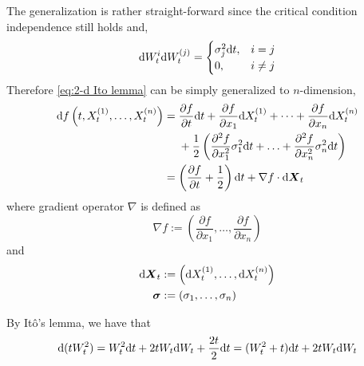 \documentclass{homework}
\begin{document}
\begin{subproblem}[(\alph*)]
        \item
        The generalization is rather straight-forward since
        the critical condition independence still holds and,
        \[\mathrm d W_t^{i}\mathrm d W_t^{(j)}=
        \begin{cases}
            \sigma_j^2\mathrm d t,&i=j\\
            0,&i\neq j
        \end{cases}\]
        Therefore \cref{eq:2-d Ito lemma} can be simply generalized
        to $n$-dimension,
        \begin{equation*}
            \begin{aligned}
            \mathrm d f\left(t,X_t^{(1)},\ldots,X_t^{(n)}\right)&=
            \begin{aligned}[t]
            &\frac{\partial f}{\partial t}\mathrm d t
            +\frac{\partial f}{\partial x_1}\mathrm d X_t^{(1)}
            +\cdots
            +\frac{\partial f}{\partial x_n}\mathrm d X_t^{(n)}\\
            &+\frac{1}{2}\left(
                \frac{\partial^2 f}{\partial x_1^2}\sigma_1^2\mathrm d t
                +\ldots
                +\frac{\partial^2 f}{\partial x_n^2}\sigma_n^2\mathrm d t
            \right)
            \end{aligned}\\
            &=\left(\frac{\partial f}{\partial t}
            +\frac{1}{2}\right)\mathrm d t
            +\nabla f\cdot\mathrm d\boldsymbol X_t
            \end{aligned}
        \end{equation*}
        where gradient operator $\nabla$ is defined as
        \[\nabla f:=\left(\frac{\partial f}{\partial x_1},\ldots,\frac{\partial f}{\partial x_n}\right)\]
        and
        \[\begin{aligned}
            \mathrm d\boldsymbol X_t&:=
            \left(\mathrm d X_t^{(1)},\ldots,\mathrm d X_t^{(n)}\right)\\
            \boldsymbol\sigma&:=
            \left(\sigma_1,\ldots,\sigma_n\right)
        \end{aligned}\]
        
        \item
    \end{subproblem}

    \problem
    By It\^o's lemma, we have that
    \[\mathrm d (tW_t^2)=W_t^2\mathrm d t+2tW_t\mathrm d W_t+\frac{2t}{2}\mathrm d t
    =(W_t^2+t)\mathrm d t+2tW_t\mathrm d W_t\]
\end{document}
